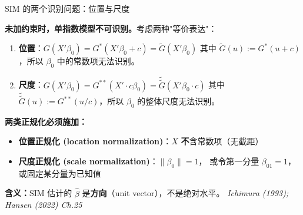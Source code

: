 \documentclass[aspectratio=169, 10pt]{beamer}
\begin{document}
\begin{frame}{SIM 的两个识别问题：位置与尺度}

  \textbf{未加约束时，单指数模型不可识别。}考虑两种"等价表达"：

  \begin{enumerate}\setlength{\itemsep}{2pt}
    \item \textbf{位置}：$G(X'\beta_0) = G^{*}(X'\beta_0 + c) = \tilde G(X'\beta_0)$
    其中 $\tilde G(u) := G^{*}(u + c)$，所以 $\beta_0$ 中的常数项无法识别。

    \item \textbf{尺度}：$G(X'\beta_0) = G^{**}(X' \cdot c\beta_0) = \tilde{\tilde G}(X'\beta_0 \cdot c)$
    其中 $\tilde{\tilde G}(u) := G^{**}(u/c)$，所以 $\beta_0$ 的整体尺度无法识别。
  \end{enumerate}

  \begin{highlightbox}
    \textbf{两类正规化必须施加：}
    \begin{itemize}\setlength{\itemsep}{1pt}
      \item \textbf{位置正规化 (location normalization)}：$X$ \textbf{不}含常数项（无截距）
      \item \textbf{尺度正规化 (scale normalization)}：$\|\beta_0\| = 1$，
      或令第一分量 $\beta_{01} = 1$，或固定某分量为已知值
    \end{itemize}
  \end{highlightbox}

  \textbf{含义：}SIM 估计的 $\hat\beta$ 是\textbf{方向}（unit vector），不是绝对水平。
  \hfill{\scriptsize\textit{Ichimura (1993); Hansen (2022) Ch.25}}
  \hypertarget{main-c1}{}
  \hfill{\scriptsize\hyperlink{proof-c1}{}}

\end{frame}
\end{document}
